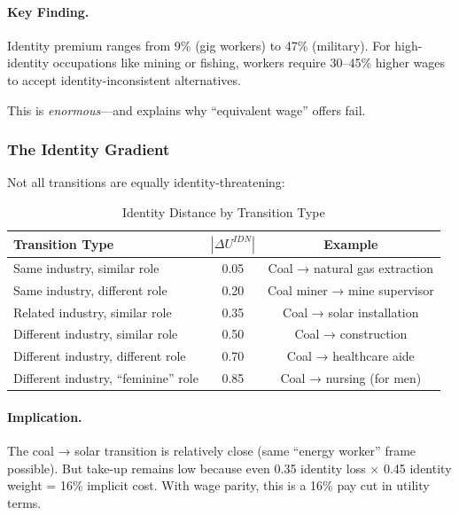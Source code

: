 \paragraph{Key Finding.}
Identity premium ranges from 9\% (gig workers) to 47\% (military). 
For high-identity occupations like mining or fishing, workers require 
30--45\% higher wages to accept identity-inconsistent alternatives.

This is \emph{enormous}---and explains why ``equivalent wage'' offers fail.

\subsubsection{The Identity Gradient}

Not all transitions are equally identity-threatening:

\begin{table}[htbp]
\centering
\caption{Identity Distance by Transition Type}
\label{tab:identity-distance}
\begin{tabular}{@{}lcc@{}}
\toprule
\textbf{Transition Type} & \textbf{$|\Delta U^{IDN}|$} & \textbf{Example} \\
\midrule
Same industry, similar role & 0.05 & Coal → natural gas extraction \\
Same industry, different role & 0.20 & Coal miner → mine supervisor \\
Related industry, similar role & 0.35 & Coal → solar installation \\
Different industry, similar role & 0.50 & Coal → construction \\
Different industry, different role & 0.70 & Coal → healthcare aide \\
Different industry, ``feminine'' role & 0.85 & Coal → nursing (for men) \\
\bottomrule
\end{tabular}
\end{table}

\paragraph{Implication.}
The coal → solar transition is relatively close (same ``energy worker'' 
frame possible). But take-up remains low because even 0.35 identity 
loss × 0.45 identity weight = 16\% implicit cost. With wage parity, 
this is a 16\% pay cut in utility terms.


